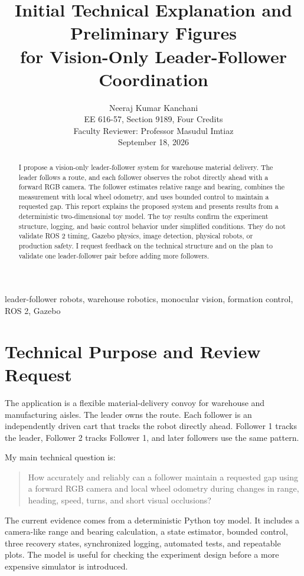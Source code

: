 \documentclass[10pt,onecolumn]{IEEEtran}
\title{Initial Technical Explanation and Preliminary Figures\\
for Vision-Only Leader-Follower Coordination}
\author{Neeraj Kumar Kanchani\\
EE 616-57, Section 9189, Four Credits\\
Faculty Reviewer: Professor Masudul Imtiaz\\
September 18, 2026}
\begin{document}
\maketitle

\begin{abstract}
I propose a vision-only leader-follower system for warehouse material delivery.
The leader follows a route, and each follower observes the robot directly ahead with a forward RGB camera.
The follower estimates relative range and bearing, combines the measurement with local wheel odometry, and uses bounded control to maintain a requested gap.
This report explains the proposed system and presents results from a deterministic two-dimensional toy model.
The toy results confirm the experiment structure, logging, and basic control behavior under simplified conditions.
They do not validate ROS 2 timing, Gazebo physics, image detection, physical robots, or production safety.
I request feedback on the technical structure and on the plan to validate one leader-follower pair before adding more followers.
\end{abstract}

\begin{IEEEkeywords}
leader-follower robots, warehouse robotics, monocular vision, formation control, ROS 2, Gazebo
\end{IEEEkeywords}

\section{Technical Purpose and Review Request}

The application is a flexible material-delivery convoy for warehouse and manufacturing aisles.
The leader owns the route.
Each follower is an independently driven cart that tracks the robot directly ahead.
Follower 1 tracks the leader, Follower 2 tracks Follower 1, and later followers use the same pattern.

My main technical question is:

\begin{quote}
How accurately and reliably can a follower maintain a requested gap using a forward RGB camera and local wheel odometry during changes in range, heading, speed, turns, and short visual occlusions?
\end{quote}

The current evidence comes from a deterministic Python toy model.
It includes a camera-like range and bearing calculation, a state estimator, bounded control, three recovery states, synchronized logging, automated tests, and repeatable plots.
The model is useful for checking the experiment design before a more expensive simulator is introduced.
\end{document}
